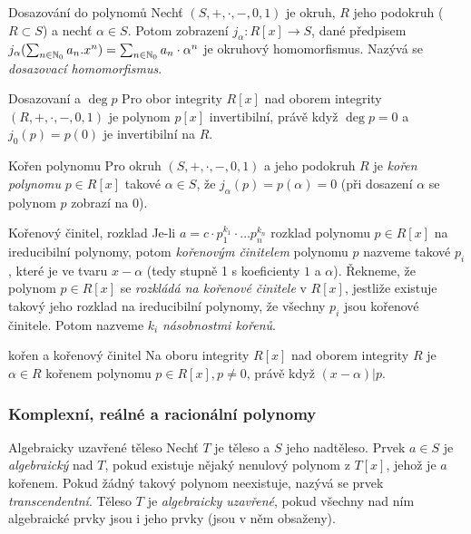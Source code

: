 \begin{definiceN}{Dosazování do polynomů}
Nechť $(S,+,\cdot,-,0,1)$ je okruh, $R$ jeho podokruh ($R\subset S$) a nechť $\alpha\in S$. Potom zobrazení $j_\alpha : R[x]\to S$, dané předpisem $j_\alpha(\sum_{n\in\mathbb{N}_0}a_n.x^n) = \sum_{n\in\mathbb{N}_0}a_n\cdot\alpha^n$ je okruhový homomorfismus. Nazývá se \emph{dosazovací homomorfismus}.
\end{definiceN}

\begin{poznamkaN}{Dosazovaní a $\deg p$}
Pro obor integrity $R[x]$ nad oborem integrity $(R,+,\cdot,-,0,1)$ je polynom $p[x]$ invertibilní, právě když $\deg p=0$ a $j_0(p)=p(0)$ je invertibilní na $R$.
\end{poznamkaN}

\begin{definiceN}{Kořen polynomu}
Pro okruh $(S,+,\cdot,-,0,1)$ a jeho podokruh $R$ je \emph{kořen polynomu} $p\in R[x]$ takové $\alpha\in S$, že $j_\alpha(p)=p(\alpha)=0$ (při dosazení $\alpha$ se polynom $p$ zobrazí na $0$).
\end{definiceN}

\begin{definiceN}{Kořenový činitel, rozklad}
Je-li $a=c\cdot p_1^{k_1}\cdot\dots p_n^{k_n}$ rozklad polynomu $p\in R[x]$ na ireducibilní polynomy, potom \emph{kořenovým činitelem} polynomu $p$ nazveme takové $p_i$, které je ve tvaru $x-\alpha$ (tedy stupně 1 s koeficienty $1$ a $\alpha$). Řekneme, že polynom $p\in R[x]$ se \emph{rozkládá na kořenové činitele} v $R[x]$, jestliže existuje takový jeho rozklad na ireducibilní polynomy, že všechny $p_i$ jsou kořenové činitele. Potom nazveme $k_i$ \emph{násobnostmi kořenů}.
\end{definiceN}

\begin{vetaN}{kořen a kořenový činitel}
Na oboru integrity $R[x]$ nad oborem integrity $R$ je $\alpha\in R$ kořenem polynomu $p\in R[x],p\neq 0$, právě když $(x-\alpha)|p$. 
\end{vetaN}

\subsubsection*{Komplexní, reálné a racionální polynomy}

\begin{definiceN}{Algebraicky uzavřené těleso}
Nechť $T$ je těleso a $S$ jeho nadtěleso. Prvek $a\in S$ je \emph{algebraický} nad $T$, pokud existuje nějaký nenulový polynom z $T[x]$, jehož je $a$ kořenem. Pokud žádný takový polynom neexistuje, nazývá se prvek \emph{transcendentní}. Těleso $T$ je \emph{algebraicky uzavřené}, pokud všechny nad ním algebraické prvky jsou i jeho prvky (jsou v něm obsaženy).
\end{definiceN}

